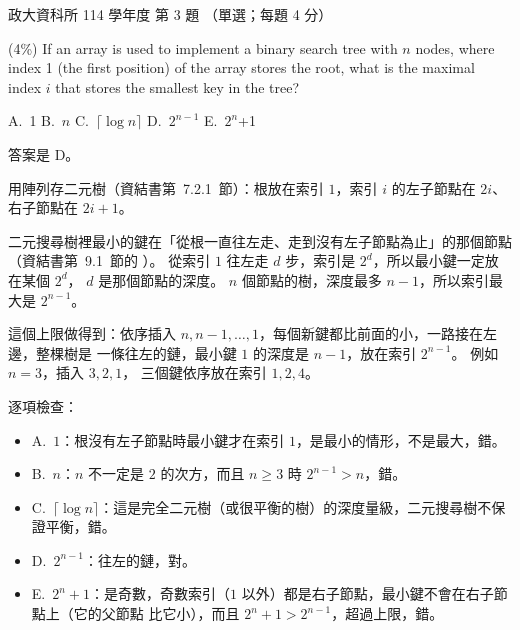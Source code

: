 \begin{pastexam}[label={px:nccu-114-dsa-03}]{政大資科所 114 學年度 第 3 題}
（單選；每題 4 分）

(4\%) If an array is used to implement a binary search tree with $n$ nodes, where index 1 (the
first position) of the array stores the root, what is the maximal index $i$ that stores the
smallest key in the tree?

A.~1 \qquad B.~$n$ \qquad C.~$\lceil\log n\rceil$ \qquad D.~$2^{n-1}$ \qquad E.~$2^n$+1
\end{pastexam}

\begin{pastsoln}
答案是 D。

用陣列存二元樹（資結書第~7.2.1~節）：根放在索引 $1$，索引 $i$ 的左子節點在 $2i$、右子節點在
$2i + 1$。

二元搜尋樹裡最小的鍵在「從根一直往左走、走到沒有左子節點為止」的那個節點（資結書第~9.1~節的
）。 從索引 $1$ 往左走 $d$ 步，索引是 $2^d$，所以最小鍵一定放在某個 $2^d$，
$d$ 是那個節點的深度。 $n$ 個節點的樹，深度最多 $n - 1$，所以索引最大是 $2^{n-1}$。

這個上限做得到：依序插入 $n, n - 1, \ldots, 1$，每個新鍵都比前面的小，一路接在左邊，整棵樹是
一條往左的鏈，最小鍵 $1$ 的深度是 $n - 1$，放在索引 $2^{n-1}$。 例如 $n = 3$，插入 $3, 2, 1$，
三個鍵依序放在索引 $1, 2, 4$。

逐項檢查：
\begin{itemize}
\item A.~$1$：根沒有左子節點時最小鍵才在索引 $1$，是最小的情形，不是最大，錯。
\item B.~$n$：$n$ 不一定是 $2$ 的次方，而且 $n \ge 3$ 時 $2^{n-1} > n$，錯。
\item C.~$\lceil \log n \rceil$：這是完全二元樹（或很平衡的樹）的深度量級，二元搜尋樹不保證平衡，錯。
\item D.~$2^{n-1}$：往左的鏈，對。
\item E.~$2^n + 1$：是奇數，奇數索引（$1$ 以外）都是右子節點，最小鍵不會在右子節點上（它的父節點
比它小），而且 $2^n + 1 > 2^{n-1}$，超過上限，錯。
\end{itemize}
\end{pastsoln}
